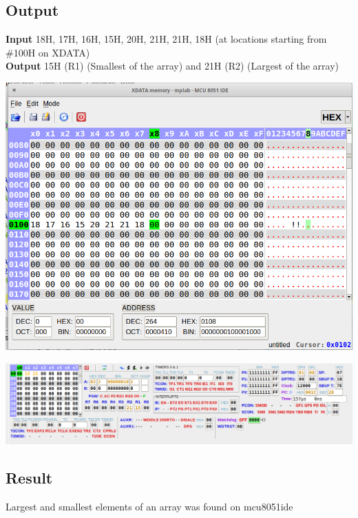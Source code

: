\subsection{Output}
\textbf{Input} 18H, 17H, 16H, 15H, 20H, 21H, 21H, 18H (at locations starting from \#100H on XDATA)\\
\textbf{Output} 15H (R1) (Smallest of the array) and 21H (R2) (Largest of the array)\\
\begin{center}
	\includegraphics[width=\textwidth]{img/p29/ss1.png}
\end{center}
\begin{center}
	\includegraphics[width=\textwidth]{img/p29/ss2.png}
\end{center}


\subsection{Result}
Largest and smallest elements of an array was found on mcu8051ide
